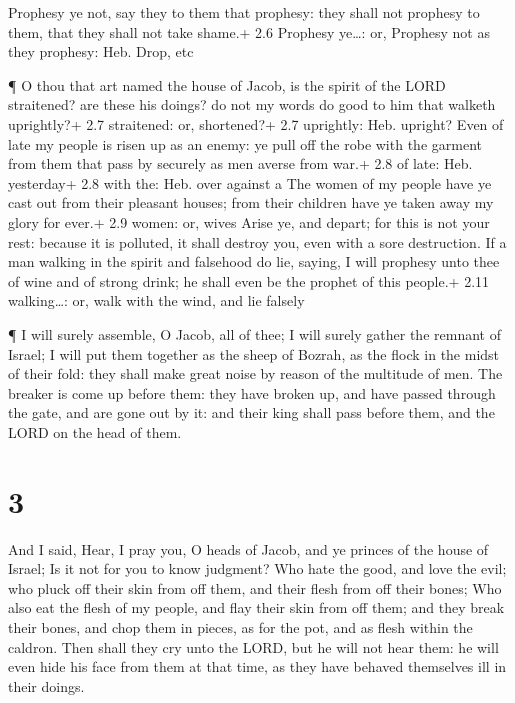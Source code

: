  Prophesy ye not, say they to them that prophesy: they shall
not prophesy to them, that they shall not take shame.+ 2.6 Prophesy
ye\ldots: or, Prophesy not as they prophesy: Heb. Drop, etc

 ¶ O thou that art named the house of Jacob, is the spirit
of the LORD straitened? are these his doings? do not my words do good to
him that walketh uprightly?+ 2.7 straitened: or, shortened?+ 2.7
uprightly: Heb. upright?  Even of late my people is risen up
as an enemy: ye pull off the robe with the garment from them that pass
by securely as men averse from war.+ 2.8 of late: Heb. yesterday+ 2.8
with the: Heb. over against a  The women of my people have
ye cast out from their pleasant houses; from their children have ye
taken away my glory for ever.+ 2.9 women: or, wives  Arise
ye, and depart; for this is not your rest: because it is polluted, it
shall destroy you, even with a sore destruction.  If a man
walking in the spirit and falsehood do lie, saying, I will prophesy unto
thee of wine and of strong drink; he shall even be the prophet of this
people.+ 2.11 walking\ldots: or, walk with the wind, and lie falsely

 ¶ I will surely assemble, O Jacob, all of thee; I will
surely gather the remnant of Israel; I will put them together as the
sheep of Bozrah, as the flock in the midst of their fold: they shall
make great noise by reason of the multitude of men.  The
breaker is come up before them: they have broken up, and have passed
through the gate, and are gone out by it: and their king shall pass
before them, and the LORD on the head of them.

\hypertarget{section-2}{%
\section{3}\label{section-2}}

 And I said, Hear, I pray you, O heads of Jacob, and ye
princes of the house of Israel; Is it not for you to know judgment?
 Who hate the good, and love the evil; who pluck off their
skin from off them, and their flesh from off their bones; 
Who also eat the flesh of my people, and flay their skin from off them;
and they break their bones, and chop them in pieces, as for the pot, and
as flesh within the caldron.  Then shall they cry unto the
LORD, but he will not hear them: he will even hide his face from them at
that time, as they have behaved themselves ill in their doings.

